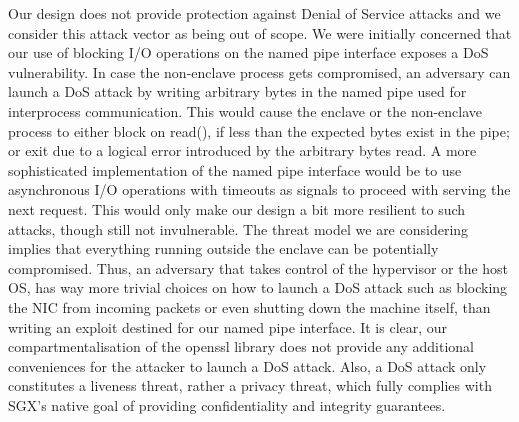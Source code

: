 \documentclass[../main.tex]{subfiles}
\begin{document}
\label{sec:limitations}
Our design does not provide protection against Denial of Service
attacks and we consider this attack vector as being out of scope. We
were initially concerned that our use of blocking I/O operations on
the named pipe interface exposes a DoS vulnerability. In case the
non-enclave process gets compromised, an adversary can launch a DoS attack
by writing arbitrary bytes in the named pipe used for interprocess
communication. This would cause the enclave or the non-enclave process to
either block on read(), if less than the expected bytes exist in the
pipe; or exit due to a logical error introduced by the arbitrary bytes
read. A more sophisticated implementation of the named pipe interface
would be to use asynchronous I/O operations with timeouts as signals
to proceed with serving the next request. This would only make our
design a bit more resilient to such attacks, though still not
invulnerable. The threat model we are considering implies that
everything running outside the enclave can be potentially compromised. Thus,
an adversary that takes control of the hypervisor or the host OS, has
way more trivial choices on how to launch a DoS attack such as
blocking the NIC from incoming packets or even shutting down the
machine itself, than writing an exploit destined for our named pipe
interface. It is clear, our compartmentalisation of the openssl
library does not provide any additional conveniences for the attacker
to launch a DoS attack. Also, a DoS attack only constitutes a liveness
threat, rather a privacy threat, which fully complies with SGX's
native goal of providing confidentiality and integrity guarantees.
\end{document}
